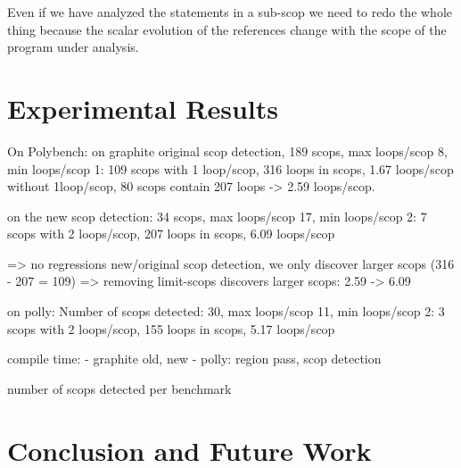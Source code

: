 \documentclass{sigplanconf}
\begin{document}
Even if we have analyzed the statements in a sub-scop we need to redo the whole thing because the scalar evolution
of the references change with the scope of the program under analysis.


\section{Experimental Results}

On Polybench:
on graphite original scop detection, 189 scops, max loops/scop 8, min loops/scop 1: 109 scops with 1 loop/scop, 316 loops in scops, 1.67 loops/scop
without 1loop/scop, 80 scops contain 207 loops -> 2.59 loops/scop.

on the new scop detection: 34 scops, max loops/scop 17, min loops/scop 2: 7 scops with 2 loops/scop, 207 loops in scops, 6.09 loops/scop

=> no regressions new/original scop detection, we only discover larger scops (316 - 207 = 109)
=> removing limit-scops discovers larger scops: 2.59 -> 6.09

on polly: Number of scops detected: 30, max loops/scop 11, min loops/scop 2: 3 scops with 2 loops/scop, 155 loops in scops, 5.17 loops/scop


compile time:
- graphite old, new
- polly: region pass, scop detection

number of scops detected per benchmark


\section{Conclusion and Future Work}



{\small

}
\end{document}
